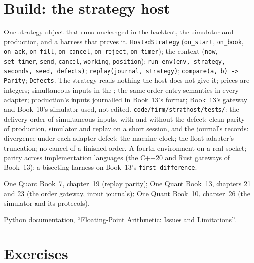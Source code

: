\section{Build: the strategy host}\label{bld:pl:simulation-production-parity:strathost}

\begin{build}
 One strategy object that runs unchanged in the backtest, the simulator and production, and a harness that proves it.
 \texttt{HostedStrategy} (\texttt{on\_start}, \texttt{on\_book}, \texttt{on\_ack}, \texttt{on\_fill},
\texttt{on\_cancel}, \texttt{on\_reject}, \texttt{on\_timer}); the context (\texttt{now}, \texttt{set\_timer}, \texttt{send},
\texttt{cancel}, \texttt{working}, \texttt{position}); \texttt{run\_env(env, strategy, seconds, seed, defects)};
\texttt{replay(journal, strategy)}; \texttt{compare(a, b) -> Parity}; \texttt{Defects}.
 The strategy reads nothing the host does not give it; prices are integers; simultaneous inputs in the ; the same
order-entry semantics in every adapter; production's inputs journalled in Book~13's format; Book~13's gateway and Book~10's simulator used,
not edited.
 \texttt{code/firm/strathost/tests/}: the delivery order of simultaneous inputs, with and without the defect; clean
parity of production, simulator and replay on a short session, and the journal's records; divergence under each adapter defect; the machine
clock; the float adapter's truncation; no cancel of a finished order.
 A fourth environment on a real socket; parity across implementation languages (the C++20 and Rust gateways of Book~13); a
bisecting harness on Book~13's \texttt{first\_difference}.
\end{build}

\begin{omsources}
\item One Quant Book~7, chapter~19 (replay parity); One Quant Book~13, chapters 21 and 23 (the order gateway, input journals); One Quant
Book~10, chapter~26 (the simulator and its protocols).
\item Python documentation, ``Floating-Point Arithmetic: Issues and Limitations''.
\end{omsources}

\section{Exercises}

